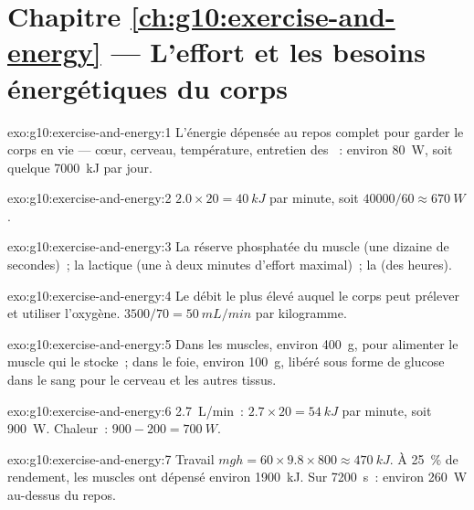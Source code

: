 \section*{Chapitre \ref{ch:g10:exercise-and-energy} --- L'effort et les besoins énergétiques du corps}

\begin{solution}{exo:g10:exercise-and-energy:1}
L'énergie dépensée au repos complet pour garder le corps en vie ---
cœur, cerveau, température, entretien des ~: environ
\qty{80}{W}, soit quelque \qty{7000}{kJ} par jour.
\end{solution}

\begin{solution}{exo:g10:exercise-and-energy:2}
$2.0 \times 20 = \qty{40}{kJ}$ par minute, soit $40000/60 \approx
\qty{670}{W}$.
\end{solution}

\begin{solution}{exo:g10:exercise-and-energy:3}
La réserve phosphatée du muscle (une dizaine de secondes)~; la
 lactique (une à deux minutes d'effort maximal)~; la
 (des heures).
\end{solution}

\begin{solution}{exo:g10:exercise-and-energy:4}
Le débit le plus élevé auquel le corps peut prélever et utiliser
l'oxygène. $3500/70 = \qty{50}{mL/min}$ par kilogramme.
\end{solution}

\begin{solution}{exo:g10:exercise-and-energy:5}
Dans les muscles, environ \qty{400}{g}, pour alimenter le muscle qui le
stocke~; dans le foie, environ \qty{100}{g}, libéré sous forme de
glucose dans le sang pour le cerveau et les autres tissus.
\end{solution}

\begin{solution}{exo:g10:exercise-and-energy:6}
\qty{2.7}{L/min}~: $2.7 \times 20 = \qty{54}{kJ}$ par minute, soit
\qty{900}{W}. Chaleur~: $900 - 200 = \qty{700}{W}$.
\end{solution}

\begin{solution}{exo:g10:exercise-and-energy:7}
Travail $mgh = 60 \times 9.8 \times 800 \approx \qty{470}{kJ}$. À 25~\%
de rendement, les muscles ont dépensé environ \qty{1900}{kJ}. Sur
\qty{7200}{s}~: environ \qty{260}{W} au-dessus du repos.
\end{solution}

